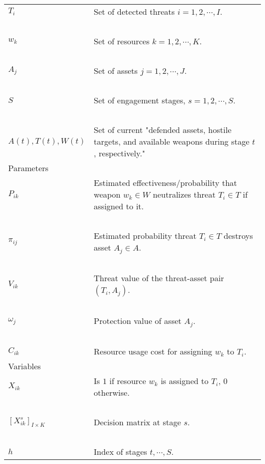 \documentclass[12pt]{article} %
\begin{document}
\begin{itemize}
\begin{center}
\begin{enumerate}
\begin{center}
\begin{tabular}{|p{4.25cm}  p{8cm}|}
    		\hline
    		$T_i$ & Set of detected threats $i = 1, 2, \cdots, I$. \\
            \ & \ \\
    		$w_k$ & Set of resources $k = 1, 2, \cdots, K$. \\
            \ & \ \\
    		$A_j$ & Set of assets $j = 1, 2, \cdots, J$. \\
            \ & \ \\
    		$S$ & Set of engagement stages, $s = 1, 2, \cdots, S$. \\
            \ & \ \\
            $A(t), T(t), W(t)$ & Set of current "defended assets, hostile targets, and available weapons during stage $t$, respectively."\\
            \hline
            Parameters & \ \\
            \hline
    		$P_{ik}$ & Estimated effectiveness/probability that weapon $w_k \in W$ neutralizes threat $T_i \in T$ if assigned to it.\\
            \ & \ \\
            $\pi_{ij}$ & Estimated probability threat $T_i \in T$ destroys asset $A_j \in A$. \\
            \ & \ \\
            $V_{ik}$ & Threat value of the threat-asset pair $(T_i, A_j)$. \\
            \ & \ \\
            $\omega_j$ & Protection value of asset $A_j$. \\
            \ & \ \\
            $C_{ik}$ & Resource usage cost for assigning $w_k$ to $T_i$. \\
            \hline
            Variables & \ \\
            \hline
            $X_{ik}$ & Is $1$ if resource $w_k$ is assigned to $T_i$, $0$ otherwise. \\
            \ & \ \\
            $\left[X_{ik}^s\right]_{I\times K}$ & Decision matrix at stage $s$. \\
            \ & \ \\
            $h$ & Index of stages $t, \cdots, S$. \\
    		\hline
    \end{tabular}
    \end{center}
\end{enumerate}
\end{center}


\end{itemize}
\end{document}
